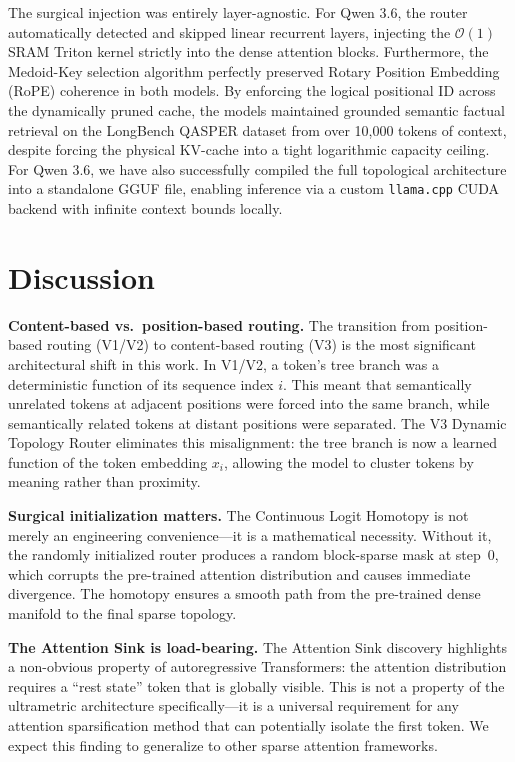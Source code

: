 \documentclass[11pt,a4paper]{article}
\begin{document}
The surgical injection was entirely layer-agnostic. For Qwen 3.6, the router automatically detected and skipped linear recurrent layers, injecting the $\mathcal{O}(1)$ SRAM Triton kernel strictly into the dense attention blocks. Furthermore, the Medoid-Key selection algorithm perfectly preserved Rotary Position Embedding (RoPE) coherence in both models. By enforcing the logical positional ID across the dynamically pruned cache, the models maintained grounded semantic factual retrieval on the LongBench QASPER dataset from over 10,000 tokens of context, despite forcing the physical KV-cache into a tight logarithmic capacity ceiling. For Qwen 3.6, we have also successfully compiled the full topological architecture into a standalone GGUF file, enabling inference via a custom \texttt{llama.cpp} CUDA backend with infinite context bounds locally.

\section{Discussion}


\textbf{Content-based vs.\ position-based routing.} The transition from position-based routing (V1/V2) to content-based routing (V3) is the most significant architectural shift in this work. In V1/V2, a token's tree branch was a deterministic function of its sequence index $i$. This meant that semantically unrelated tokens at adjacent positions were forced into the same branch, while semantically related tokens at distant positions were separated. The V3 Dynamic Topology Router eliminates this misalignment: the tree branch is now a learned function of the token embedding $x_i$, allowing the model to cluster tokens by meaning rather than proximity.

\textbf{Surgical initialization matters.} The Continuous Logit Homotopy is not merely an engineering convenience---it is a mathematical necessity. Without it, the randomly initialized router produces a random block-sparse mask at step~0, which corrupts the pre-trained attention distribution and causes immediate divergence. The homotopy ensures a smooth path from the pre-trained dense manifold to the final sparse topology.

\textbf{The Attention Sink is load-bearing.} The Attention Sink discovery highlights a non-obvious property of autoregressive Transformers: the attention distribution requires a ``rest state'' token that is globally visible. This is not a property of the ultrametric architecture specifically---it is a universal requirement for any attention sparsification method that can potentially isolate the first token. We expect this finding to generalize to other sparse attention frameworks.
\end{document}

